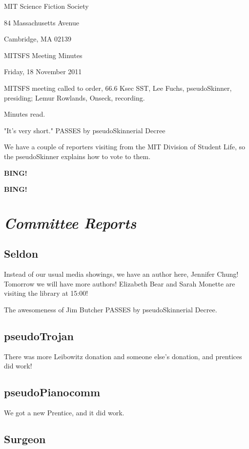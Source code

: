 \documentclass[10pt]{article}
\newcommand{\bing}{{\bf BING!} }
\newcommand{\goto}[1]{\bing \vskip 12pt \section*{{\em{#1}}}}
\newcommand{\skinner}{Lee Fuchs, pseudoSkinner}
\newcommand{\onseck}{Lemur Rowlands, Onseck}
\newcommand{\meetingdate}{Friday, 18 November 2011}
\begin{document}
\begin{center}

MIT Science Fiction Society

84 Massachusetts Avenue

Cambridge, MA 02139

\vspace{12pt}

MITSFS Meeting Minutes

\meetingdate

\end{center}

\vspace{18pt}

\setlength{\parskip}{6pt}

\noindent
MITSFS meeting called to order, 66.6 Ksec SST,
\skinner, presiding; \onseck, recording.

Minutes read.

"It's very short." PASSES by pseudoSkinnerial Decree

We have a couple of reporters visiting from the MIT Division
of Student Life, so the pseudoSkinner explains how to vote to them.

\bing

\goto{Committee Reports}

\subsection*{Seldon}

Instead of our usual media showings, we have an author here, Jennifer
Chung!  Tomorrow we will have more authors!  Elizabeth Bear and Sarah
Monette are visiting the library at 15:00!

The awesomeness of Jim Butcher PASSES by pseudoSkinnerial Decree.

\subsection*{pseudoTrojan}

There was more Leibowitz donation and someone else's donation, and
prentices did work!

\subsection*{pseudoPianocomm}

We got a new Prentice, and it did work.

\subsection*{Surgeon}
\end{document}
